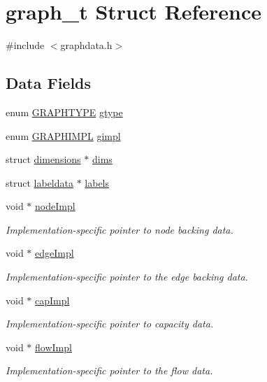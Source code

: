 \hypertarget{structgraph__t}{}\section{graph\+\_\+t Struct Reference}
\label{structgraph__t}


{\ttfamily \#include $<$graphdata.\+h$>$}

\subsection*{Data Fields}
\begin{DoxyCompactItemize}
\item 
enum \hyperlink{graphdata_8h_a384e88b524b782ff50439055cbc8a5c2}{G\+R\+A\+P\+H\+T\+Y\+PE} \hyperlink{structgraph__t_a602be255ab0523e0a5fe28436a29159a}{gtype}
\item 
enum \hyperlink{graphdata_8h_ad7f3a639f97221897a0429715dccefe6}{G\+R\+A\+P\+H\+I\+M\+PL} \hyperlink{structgraph__t_a220aff118ba6d13c927486099988c03d}{gimpl}
\item 
struct \hyperlink{graphdata_8h_a08b79828d8e700b1ff86fc235a83089f}{dimensions} $\ast$ \hyperlink{structgraph__t_ab0b7dd9b19e20a1564ba1f02ad41511e}{dims}
\item 
struct \hyperlink{graphdata_8h_a625fc818ed28f282dba71f20cd31b848}{labeldata} $\ast$ \hyperlink{structgraph__t_a2ea51094b5b0a3b3035895948ded5b44}{labels}
\item 
void $\ast$ \hyperlink{structgraph__t_a3bf6344f03f4cbc69345d026da2e3368}{node\+Impl}
\begin{DoxyCompactList}\small\item\em Implementation-\/specific pointer to node backing data. \end{DoxyCompactList}\item 
void $\ast$ \hyperlink{structgraph__t_acadea26a56e788cb109413045138faba}{edge\+Impl}
\begin{DoxyCompactList}\small\item\em Implementation-\/specific pointer to the edge backing data. \end{DoxyCompactList}\item 
void $\ast$ \hyperlink{structgraph__t_ab85359c7dfbc46f84976a85c4104b1f5}{cap\+Impl}
\begin{DoxyCompactList}\small\item\em Implementation-\/specific pointer to capacity data. \end{DoxyCompactList}\item 
void $\ast$ \hyperlink{structgraph__t_aff85993441e72a7815da3fa1b048e5eb}{flow\+Impl}
\begin{DoxyCompactList}\small\item\em Implementation-\/specific pointer to the flow data. \end{DoxyCompactList}\end{DoxyCompactItemize}


